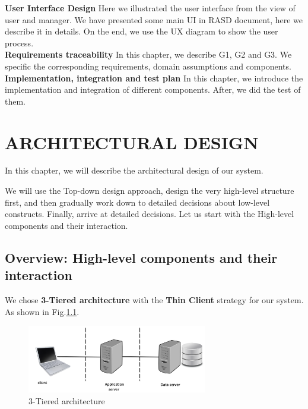 \documentclass[a4paper,12pt]{report}
\begin{document}
\textbf{User Interface Design}
Here we illustrated the user interface from the view of user and manager. We have presented some main UI in RASD document, here we describe it in details. On the end, we use the UX diagram to show the user process.~\\

\textbf{Requirements traceability}
In this chapter, we describe G1, G2 and G3. We specific the corresponding requirements, domain assumptions and components.~\\

\textbf{Implementation, integration and test plan}
In this chapter, we introduce the implementation and integration of different components. After, we did the test of them.



\chapter{ARCHITECTURAL DESIGN}\label{ch:architectural-design}

In this chapter, we will describe the architectural design of our system.

We will use the Top-down design approach, design the very high-level structure first,
and then gradually work down to detailed decisions about low-level constructs.
Finally, arrive at detailed decisions.\cite{SlidesSE2}
Let us start with the High-level components and their interaction.


\section{Overview: High-level components and their interaction}\label{sec:ArchitectureOverview}

We chose \textbf{3-Tiered architecture} with the \textbf{Thin Client} strategy for our system.
As shown in Fig.\ref{fig:ThreeTieredArchitecture}.\cite{SistemiInformativi}

\begin{figure}[H]
	\centering
	\includegraphics[width=0.7\textwidth]{ThreeTiered}
	\caption{3-Tiered architecture}
	\centering
	\label{fig:ThreeTieredArchitecture}
\end{figure}
\end{document}
